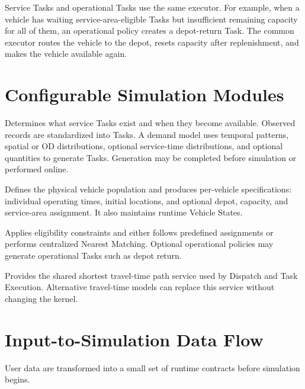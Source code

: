 \documentclass[11pt,a4paper]{article}
\begin{document}
Service Tasks and operational Tasks use the same executor. For example, when a vehicle has waiting service-area-eligible Tasks but insufficient remaining capacity for all of them, an operational policy creates a depot-return Task. The common executor routes the vehicle to the depot, resets capacity after replenishment, and makes the vehicle available again.

\section{Configurable Simulation Modules}

\begin{description}[style=nextline,font=\normalfont\bfseries]
  \item[Demand] Determines what service Tasks exist and when they become available. Observed records are standardized into Tasks. A demand model uses temporal patterns, spatial or OD distributions, optional service-time distributions, and optional quantities to generate Tasks. Generation may be completed before simulation or performed online.

  \item[Supply] Defines the physical vehicle population and produces per-vehicle specifications: individual operating times, initial locations, and optional depot, capacity, and service-area assignment. It also maintains runtime Vehicle States.

  \item[Dispatch] Applies eligibility constraints and either follows predefined assignments or performs centralized Nearest Matching. Optional operational policies may generate operational Tasks such as depot return.

  \item[Routing] Provides the shared shortest travel-time path service used by Dispatch and Task Execution. Alternative travel-time models can replace this service without changing the kernel.
\end{description}

\section{Input-to-Simulation Data Flow}

User data are transformed into a small set of runtime contracts before simulation begins.
\end{document}
